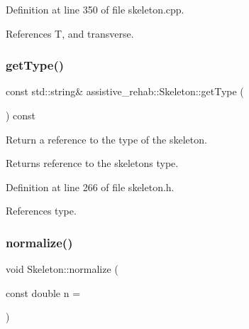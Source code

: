 Definition at line 350 of file skeleton.\+cpp.


\begin{DoxyCode}{0}

\end{DoxyCode}


References T, and transverse.

\mbox{\label{classassistive__rehab_1_1Skeleton_a4efc4844bd2b185f1080ee52ab69cb04}} 
\subsubsection{\texorpdfstring{getType()}{getType()}}
{\footnotesize\ttfamily const std\+::string\& assistive\+\_\+rehab\+::\+Skeleton\+::get\+Type (\begin{DoxyParamCaption}{ }\end{DoxyParamCaption}) const\hspace{0.3cm}{\ttfamily [inline]}}



Return a reference to the type of the skeleton. 

\begin{DoxyReturn}{Returns}
reference to the skeleton\textquotesingle{}s type. 
\end{DoxyReturn}


Definition at line 266 of file skeleton.\+h.


\begin{DoxyCode}{0}

\end{DoxyCode}


References type.

\mbox{\label{classassistive__rehab_1_1Skeleton_a7753cc8d2b43e27eaf7bf9ef640a99cb}} 
\subsubsection{\texorpdfstring{normalize()}{normalize()}}
{\footnotesize\ttfamily void Skeleton\+::normalize (\begin{DoxyParamCaption}\item[{const double}]{n = {} }\end{DoxyParamCaption})}



